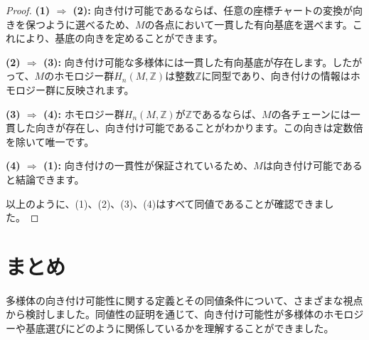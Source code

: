 \documentclass{article}
\begin{document}
\begin{proof}
\textbf{(1) $\Rightarrow$ (2):} 向き付け可能であるならば、任意の座標チャートの変換が向きを保つように選べるため、$M$の各点において一貫した有向基底を選べます。これにより、基底の向きを定めることができます。

\textbf{(2) $\Rightarrow$ (3):} 向き付け可能な多様体には一貫した有向基底が存在します。したがって、$M$のホモロジー群$H_n(M, \mathbb{Z})$は整数$\mathbb{Z}$に同型であり、向き付けの情報はホモロジー群に反映されます。

\textbf{(3) $\Rightarrow$ (4):} ホモロジー群$H_n(M, \mathbb{Z})$が$\mathbb{Z}$であるならば、$M$の各チェーンには一貫した向きが存在し、向き付け可能であることがわかります。この向きは定数倍を除いて唯一です。

\textbf{(4) $\Rightarrow$ (1):} 向き付けの一貫性が保証されているため、$M$は向き付け可能であると結論できます。

以上のように、(1)、(2)、(3)、(4)はすべて同値であることが確認できました。
\end{proof}

\section{まとめ}
多様体の向き付け可能性に関する定義とその同値条件について、さまざまな視点から検討しました。同値性の証明を通じて、向き付け可能性が多様体のホモロジーや基底選びにどのように関係しているかを理解することができました。
\end{document}

